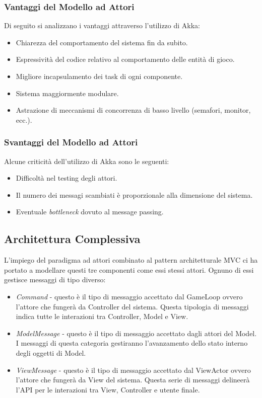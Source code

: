 \subsubsection{Vantaggi del Modello ad Attori}
Di seguito si analizzano i vantaggi attraverso l'utilizzo di Akka:
\begin{itemize}
    \item Chiarezza del comportamento del sistema fin da subito.
    \item Espressività del codice relativo al comportamento delle entità di gioco.
    \item Migliore incapsulamento dei task di ogni componente.
    \item Sistema maggiormente modulare.
    \item Astrazione di meccanismi di concorrenza di basso livello (semafori, monitor, ecc.).
\end{itemize}

\subsubsection{Svantaggi del Modello ad Attori}
Alcune criticità dell'utilizzo di Akka sono le seguenti:
\begin{itemize}
    \item Difficoltà nel testing degli attori.
    \item Il numero dei messagi scambiati è proporzionale alla dimensione del sistema.
    \item Eventuale \textit{bottleneck} dovuto al message passing.
\end{itemize}

\subsection{Architettura Complessiva}
L'impiego del paradigma ad attori combinato al pattern architetturale MVC ci ha portato a modellare questi tre componenti
come essi stessi attori. Ognuno di essi gestisce messaggi di tipo diverso:
\begin{itemize}
    \item \textit{Command} - questo è il tipo di messaggio accettato dal GameLoop ovvero l'attore che fungerà da
    Controller del sistema. Questa tipologia di messaggi indica tutte le interazioni tra Controller, Model e View.
    \item \textit{ModelMessage} - questo è il tipo di messaggio accettato dagli attori del Model. I messaggi di questa categoria
    gestiranno l'avanzamento dello stato interno degli oggetti di Model.
    \item \textit{ViewMessage} - questo è il tipo di messaggio accettato dal ViewActor ovvero l'attore che fungerà da View
    del sistema. Questa serie di messaggi delineerà l'API per le interazioni tra View, Controller e utente finale.
\end{itemize}

